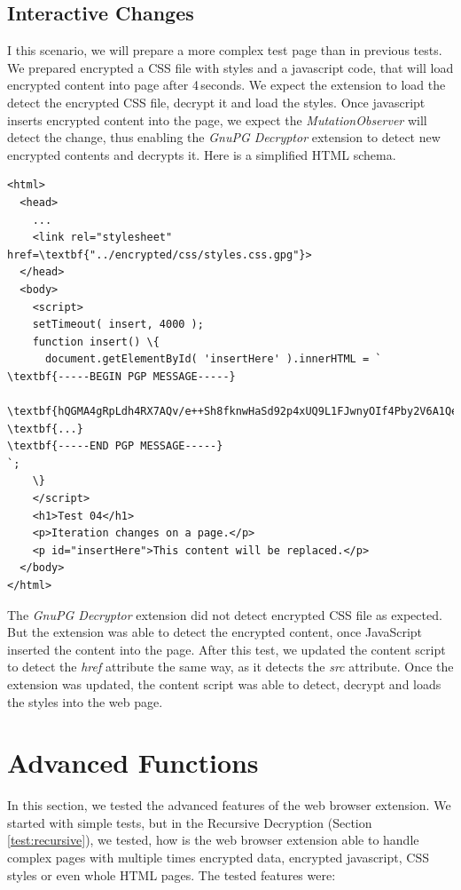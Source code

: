 \subsection{Interactive Changes}
\label{test:interactive}
I this scenario, we will prepare a more complex test page than in previous tests. We prepared encrypted a CSS file with styles and a javascript code, that will load encrypted content into page after 4\,seconds. We expect the extension to load the detect the encrypted CSS file, decrypt it and load the styles. Once javascript inserts encrypted content into the page, we expect the \textit{MutationObserver} will detect the change, thus enabling the \textit{GnuPG Decryptor} extension to detect new encrypted contents and decrypts it. Here is a simplified HTML schema.
\begin{Verbatim}[commandchars=\\\{\},codes={\catcode`$=3\catcode`_=8},samepage=false,frame=single]
<html>
  <head>
    ...
    <link rel="stylesheet" href=\textbf{"../encrypted/css/styles.css.gpg"}>
  </head>
  <body>
    <script>
    setTimeout( insert, 4000 );
    function insert() \{
      document.getElementById( 'insertHere' ).innerHTML = `
\textbf{-----BEGIN PGP MESSAGE-----}

\textbf{hQGMA4gRpLdh4RX7AQv/e++Sh8fknwHaSd92p4xUQ9L1FJwnyOIf4Pby2V6A1Qe7}
\textbf{...}
\textbf{-----END PGP MESSAGE-----}
`;
    \}
    </script>
    <h1>Test 04</h1>
    <p>Iteration changes on a page.</p>
    <p id="insertHere">This content will be replaced.</p>
  </body>
</html>
\end{Verbatim}

The \textit{GnuPG Decryptor} extension did not detect encrypted CSS file as expected. But the extension was able to detect the encrypted content, once JavaScript inserted the content into the page. After this test, we updated the content script to detect the \textit{href} attribute the same way, as it detects the \textit{src} attribute. Once the extension was updated, the content script was able to detect, decrypt and loads the styles into the web page.


\section{Advanced Functions}
\label{test:advancedFunctions}
In this section, we tested the advanced features of the web browser extension. We started with simple tests, but in the Recursive Decryption (Section \ref{test:recursive}), we tested, how is the web browser extension able to handle complex pages with multiple times encrypted data, encrypted javascript, CSS styles or even whole HTML pages. The tested features were:

